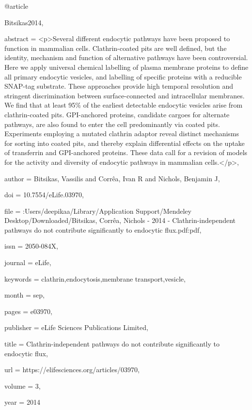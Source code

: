 @article{Bitsikas2014,

abstract = {{\textless}p{\textgreater}Several different endocytic pathways have been proposed to function in mammalian cells. Clathrin-coated pits are well defined, but the identity, mechanism and function of alternative pathways have been controversial. Here we apply universal chemical labelling of plasma membrane proteins to define all primary endocytic vesicles, and labelling of specific proteins with a reducible SNAP-tag substrate. These approaches provide high temporal resolution and stringent discrimination between surface-connected and intracellular membranes. We find that at least 95{\%} of the earliest detectable endocytic vesicles arise from clathrin-coated pits. GPI-anchored proteins, candidate cargoes for alternate pathways, are also found to enter the cell predominantly via coated pits. Experiments employing a mutated clathrin adaptor reveal distinct mechanisms for sorting into coated pits, and thereby explain differential effects on the uptake of transferrin and GPI-anchored proteins. These data call for a revision of models for the activity and diversity of endocytic pathways in mammalian cells.{\textless}/p{\textgreater}},

author = {Bitsikas, Vassilis and Corr{\^{e}}a, Ivan R and Nichols, Benjamin J},

doi = {10.7554/eLife.03970},

file = {:Users/deepikaa/Library/Application Support/Mendeley Desktop/Downloaded/Bitsikas, Corr{\^{e}}a, Nichols - 2014 - Clathrin-independent pathways do not contribute significantly to endocytic flux.pdf:pdf},

issn = {2050-084X},

journal = {eLife},

keywords = {clathrin,endocytosis,membrane transport,vesicle},

month = {sep},

pages = {e03970},

publisher = {eLife Sciences Publications Limited},

title = {{Clathrin-independent pathways do not contribute significantly to endocytic flux}},

url = {https://elifesciences.org/articles/03970},

volume = {3},

year = {2014}

}

